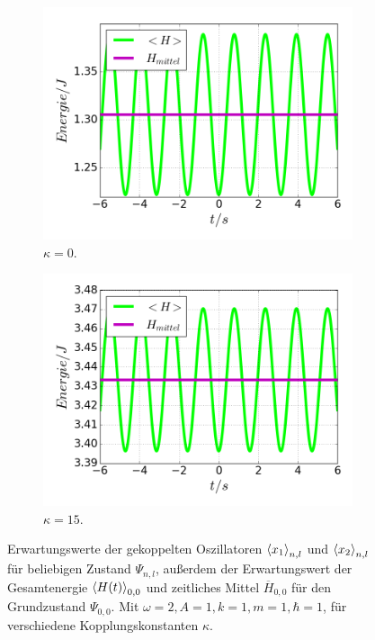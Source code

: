 \begin{figure}
      \begin{subfigure}[t]{0.5\textwidth}
        \centering
        \includegraphics[width=\textwidth]{plots/<H>00_kappa0.png}
        \caption{$\kappa=0$.}
        \label{fig:H_kappa0}
      \end{subfigure}
      \begin{subfigure}[t]{0.5\textwidth}
          \centering
          \includegraphics[width=\textwidth]{plots/<H>00_kappa15.png}
          \caption{$\kappa=15$.}
          \label{fig:H_kappa15}
      \end{subfigure}
      \caption{Erwartungswerte der gekoppelten Oszillatoren $\braket{x_1}_{n,l}$ und $\braket{x_2}_{n,l}$ für beliebigen Zustand $\Psi_{n,l}$, außerdem der Erwartungswert der Gesamtenergie $\braket{H(t)}_{0,0}$ und zeitliches Mittel $\overline{H}_{0,0}$ für den Grundzustand $\Psi_{0,0}$. Mit $\omega=2 , A=1 , k=1 , m=1 , \hbar=1$, für verschiedene Kopplungskonstanten $\kappa$.}
    \end{figure}
\fi

